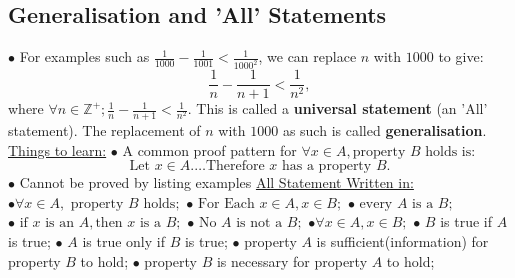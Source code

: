 \documentclass{article}
\begin{document}
\subsection{Generalisation and 'All' Statements}
$\bullet$ For examples such as $\frac{1}{1000} - \frac{1}{1001} < \frac{1}{1000^2}$, we can replace $n$ with $1000$ to give:
$$\frac{1}{n} - \frac{1}{n + 1} < \frac{1}{n^2},$$
where $\forall n \in \mathbb{Z}^+; \frac{1}{n} - \frac{1}{n + 1} < \frac{1}{n^2}.$
\newline
\newline
This is called a \textbf{ universal statement }(an 'All' statement). The replacement of $n$ with $1000$ as such is called \textbf{generalisation}.
\newline
\newline
\underline{Things to learn:}
\newline
\newline
$\bullet$ A common proof pattern for $\forall x \in A, \text{property } B \text{  holds is:}$
$$\text{Let } x \in A.
\dots 
\text{Therefore $x$ has a property  } B.$$
$\bullet$ Cannot be proved by listing examples
\newline
\newline
\underline{All Statement Written in:}
\newline
$\bullet  \forall x \in A, \text{ property $B$ holds};$
\newline
$\bullet \text{ For Each } x \in A, x \in B;$
\newline
$\bullet \text{ every } A \text{ is a } B;$
\newline
$\bullet \text{ if } x \text{ is an } A, \text{then } x \text{ is a } B;$
\newline
$\bullet \text{ No } A \text{ is not a } B;$
\newline
$\bullet \forall x \in A, x \in B;$
\newline
$\bullet$ $B$ is true if $A$ is true;
\newline
$\bullet$ $A$ is true only if $B$ is true;
\newline
$\bullet$ property $A$ is sufficient(information) for property $B$ to hold;
\newline
$\bullet$ property $B$ is necessary for property $A$ to hold;
\newline
{}
\newpage
\end{document}
